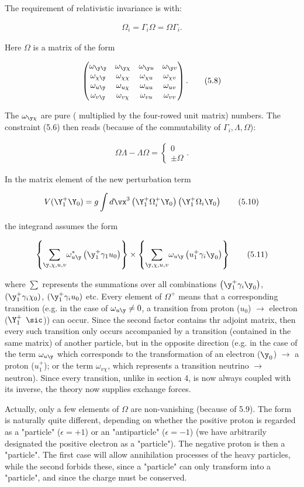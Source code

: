 \documentclass{article}
\newcommand{\nequ}[2]{
\begin{align*}
#1
\tag{#2}
\end{align*}
}
\newcommand{\sumX}[1]{\underset{#1}{\sum}}
\begin{document}
The requirement of relativistic invariance is  with:
\nequ{
\Omega_i = \Gamma_i \Omega = \Omega \Gamma_i.
}{5.7}
Here $\Omega$ is a matrix of the form
\nequ{
\left(
\begin{matrix}
\omega_{\y\y} & \omega_{\y\chi} & \omega_{\y u} & \omega_{\y v} \\
\omega_{\chi\y} & \omega_{\chi\chi} & \omega_{\chi u} & \omega_{\chi v} \\
\omega_{u\y} & \omega_{u\chi} & \omega_{u u} & \omega_{u v} \\
\omega_{v\y} & \omega_{v\chi} & \omega_{v u} & \omega_{v v} \\
\end{matrix}\right).
}{5.8}
The $\omega_{\y\chi}$ are pure ( multiplied by the four-rowed unit matrix) numbers. The constraint (5.6) then reads (because of the commutability of $\Gamma_i,\Lambda,\Omega$):
\nequ{
\Omega\Lambda - \Lambda\Omega = \begin{cases}
 0\\
 \pm \Omega
 \end{cases}.
}{5.9}
In the matrix element of the new perturbation term
\nequ{
V(\Y_1^+ \Y_0) = g\int{d\vx}^3 \left(\Y_1^+ \Omega_i^+ \Y_0 \right)\left(
\Y_1^+ \Omega_i \Y_0 \right)
}{5.10}
the integrand assumes the form
\nequ{
\left\{\sumX{\y,\chi,u,v}\omega_{u\y}^*\left(\y_1^+ \gamma_1 u_0 \right)\right\}\times
\left\{\sumX{\y,\chi,u,v}\omega_{u\y}\left(u_1^+ \gamma_i \y_0 \right)\right\}
}{5.11}
where $\sum$ represents the summations over all combinations $\left(\y_1^+ \gamma_i \y_0\right)$, $(\y_1^+ \gamma_i \chi_0)$, $(\y_1^+ \gamma_i u_0)$ etc. Every  element of $\Omega^+$ means that a corresponding transition (e.g. in the case of $\omega_{u\y} \neq 0$, a transition from proton ($u_0$) $\to$ electron ($\Y_1^+$ $\sic$)) can occur. Since the second factor contains thr adjoint matrix, then every such transition only occurs accompanied by a transition (contained in the same matrix) of another particle, but in the opposite direction (e.g. in the case of the term $\omega_{u\y}$ which corresponds to the transformation of an electron ($\y_0$) $\to$ a proton ($u_1^+$); or the term $\omega_{v\chi}$, which represents a transition neutrino $\to$ neutron). Since every transition, unlike in section 4, is now always coupled with its inverse, the theory now supplies exchange forces.

Actually, only a few elements of $\Omega$ are non-vanishing (because of 5.9). The form is naturally quite different, depending on whether the positive proton is regarded as a "particle" ($\epsilon = +1$) or an "antiparticle" ($\epsilon=-1$) (we have arbitrarily designated the positive electron as a "particle"). The negative proton is then a "particle". The first case will allow annihilation processes of the heavy particles, while the second forbids these, since a "particle" can only transform into a "particle", and since the charge must be conserved.
\end{document}
